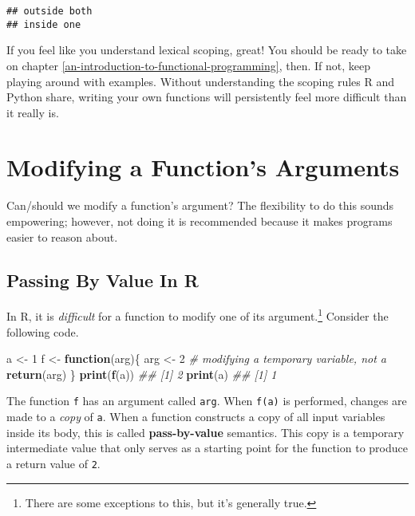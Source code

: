 \documentclass[12pt,krantz2]{krantz}
\makeatletter
\newenvironment{Shaded}{\begin{snugshade}}{\end{snugshade}}
\newcommand{\CommentTok}[1]{\textcolor[rgb]{0.37,0.37,0.37}{\textit{#1}}}
\newcommand{\ControlFlowTok}[1]{\textcolor[rgb]{0.27,0.27,0.27}{\textbf{#1}}}
\newcommand{\DecValTok}[1]{\textcolor[rgb]{0.06,0.06,0.06}{#1}}
\newcommand{\KeywordTok}[1]{\textcolor[rgb]{0.27,0.27,0.27}{\textbf{#1}}}
\newcommand{\NormalTok}[1]{#1}
\newcommand{\StringTok}[1]{\textcolor[rgb]{0.5,0.5,0.5}{#1}}
\newenvironment{kframe}{%
\medskip{}
\setlength{\fboxsep}{.8em}
 \def\at@end@of@kframe{}%
 \ifinner\ifhmode%
  \def\at@end@of@kframe{\end{minipage}}%
  \begin{minipage}{\columnwidth}%
 \fi\fi%
 \def\FrameCommand##1{\hskip\@totalleftmargin \hskip-\fboxsep
 \colorbox{shadecolor}{##1}\hskip-\fboxsep
     \hskip-\linewidth \hskip-\@totalleftmargin \hskip\columnwidth}%
 \MakeFramed {\advance\hsize-\width
   \@totalleftmargin\z@ \linewidth\hsize
   \@setminipage}}%
 {\par\unskip\endMakeFramed%
 \at@end@of@kframe}
\renewenvironment{Shaded}{\begin{kframe}}{\end{kframe}}
\makeatother
\begin{document}
\begin{verbatim}
## outside both
## inside one
\end{verbatim}

If you feel like you understand lexical scoping, great! You should be ready to take on chapter \ref{an-introduction-to-functional-programming}, then. If not, keep playing around with examples. Without understanding the scoping rules R and Python share, writing your own functions will persistently feel more difficult than it really is.

\hypertarget{modifying-a-functions-arguments}{%
\section{Modifying a Function's Arguments}\label{modifying-a-functions-arguments}}

Can/should we modify a function's argument? The flexibility to do this sounds empowering; however, not doing it is recommended because it makes programs easier to reason about.

\hypertarget{passing-by-value-in-r}{%
\subsection{Passing By Value In R}\label{passing-by-value-in-r}}

In R, it is \emph{difficult} for a function to modify one of its argument.\footnote{There are some exceptions to this, but it's generally true.} Consider the following code.

\begin{Shaded}
\begin{Highlighting}[]
\NormalTok{a <-}\StringTok{ }\DecValTok{1}
\NormalTok{f <-}\StringTok{ }\ControlFlowTok{function}\NormalTok{(arg)\{}
\NormalTok{  arg <-}\StringTok{ }\DecValTok{2} \CommentTok{# modifying a temporary variable, not a}
  \KeywordTok{return}\NormalTok{(arg)}
\NormalTok{\}}
\KeywordTok{print}\NormalTok{(}\KeywordTok{f}\NormalTok{(a))}
\CommentTok{## [1] 2}
\KeywordTok{print}\NormalTok{(a)}
\CommentTok{## [1] 1}
\end{Highlighting}
\end{Shaded}

The function \texttt{f} has an argument called \texttt{arg}. When \texttt{f(a)} is performed, changes are made to a \emph{copy} of \texttt{a}. When a function constructs a copy of all input variables inside its body, this is called \textbf{pass-by-value} semantics. This copy is a temporary intermediate value that only serves as a starting point for the function to produce a return value of \texttt{2}.
\end{document}

